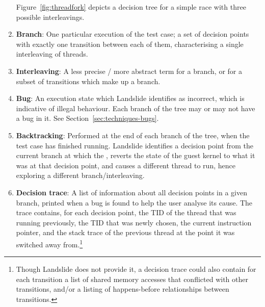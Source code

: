 \begin{enumerate}
		Figure~\ref{fig:threadfork} depicts a decision tree for a simple race with three possible interleavings.
	\item {\bf Branch}:
		One particular execution of the test case; a set of decision points with exactly one transition between each of them, characterising a single interleaving of threads.
	\item {\bf Interleaving}:
		A less precise / more abstract term for a branch, or for a subset of transitions which make up a branch.
	\item {\bf Bug}: An execution state which Landslide identifies as incorrect, which is indicative of illegal behaviour. Each branch of the tree may or may not have a bug in it. See Section~\ref{sec:techniques-bugs}.
	\item {\bf Backtracking}:
		Performed at the end of each branch of the tree, when the test case has finished running. Landslide identifies a decision point from the current branch at which the , reverts the state of the guest kernel to what it was at that decision point, and causes a different thread to run, hence exploring a different branch/interleaving.
	\item {\bf Decision trace}:
		A list of information about all decision points in a given branch, printed when a bug is found to help the user analyse its cause. The trace contains, for each decision point, the TID of the thread that was running previously, the TID that was newly chosen, the current instruction pointer, and the stack trace of the previous thread at the point it was switched away from.\footnote{Though Landslide does not provide it, a decision trace could also contain for each transition a list of shared memory accesses that conflicted with other transitions, and/or a listing of happens-before relationships between transitions.}
\end{enumerate}

